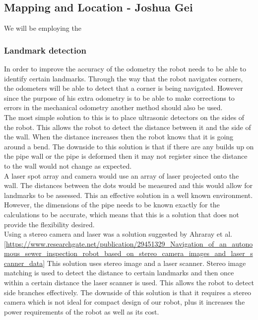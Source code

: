 \documentclass[11pt]{article}		%
\begin{document}
		\subsection[Mapping and Location]{Mapping and Location - Joshua Gei}

       		We will be employing the

		\subsubsection{Landmark detection}
	        In order to improve the accuracy of the odometry the robot needs to be able to identify certain landmarks. 
	        Through the way that the robot navigates corners, the odometers will be able to detect that a corner is being navigated. 
	        However since the purpose of his extra odometry is to be able to make corrections to errors in the mechanical odometry another method should also be used.
	        \\
	        The most simple solution to this is to place ultrasonic detectors on the sides of the robot. 
	        This allows the robot to detect the distance between it and the side of the wall. 
	        When the distance increases then the robot knows that it is going around a bend. 
	        The downside to this solution is that if there are any builds up on the pipe wall or the pipe is deformed then it may not register since the distance to the wall would not change as expected.
	        \\
	        A laser spot array and camera would use an array of laser projected onto the wall. 
	        The distances between the dots would be measured and this would allow for landmarks to be assessed. 
	        This an effective solution in a well known environment. 
	        However, the dimensions of the pipe needs to be known exactly for the calculations to be accurate, which means that this is a solution that does not provide the flexibility desired.
	        \\
	        Using a stereo camera and laser was a solution suggested by Ahraray et al. [\url{https://www.researchgate.net/publication/29451329_Navigation_of_an_autonomous_sewer_inspection_robot_based_on_stereo_camera_images_and_laser_scanner_data}] 
	        This solution uses stereo image and a laser scanner. 
	        Stereo image matching is used to detect the distance to certain landmarks and then once within a certain distance the laser scanner is used. 
	        This allows the robot to detect side branches effectively. 
	        The downside of this solution is that it requires a stereo camera which is not ideal for compact design of our robot, plus it increases the power requirements of the robot as well as its cost.
\end{document}
